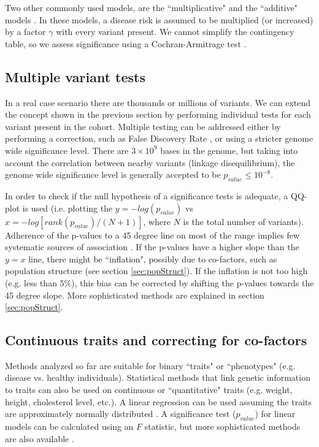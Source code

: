 Two other commonly used models, are the ``multiplicative" and the ``additive" models \cite{balding2006tutorial,clarke2011basic}. In these models, a disease risk is assumed to be multiplied (or increased) by a factor $\gamma$ with every variant present. We cannot simplify the contingency table, so we assess significance using a Cochran-Armitrage test \cite{clarke2011basic}.

\subsection{Multiple variant tests}

In a real case scenario there are thousands or millions of variants. We can extend the concept shown in the previous section by performing individual tests for each variant present in the cohort. Multiple testing can be addressed either by performing a correction, such as False Discovery Rate \cite{balding2006tutorial, clarke2011basic}, or using a stricter genome wide significance level. There are $3 \times 10^9$ bases in the genome, but taking into account the correlation between nearby variants (linkage disequilibrium), the genome wide significance level is generally accepted to be $p_{value} \leq 10^{-8}$.

In order to check if the null hypothesis of a significance tests is adequate, a QQ-plot is used (i.e. plotting the $y = -log(p_{value})$ vs $x = -log[ rank(p_{value}) / (N+1) ]$, where $N$ is the total number of variants). Adherence of the p-values to a 45 degree line on most of the range implies few systematic sources of association \cite{balding2006tutorial, clarke2011basic}. If the p-values have a higher slope than the $y=x$ line, there might be ``inflation", possibly due to co-factors, such as population structure (see section \ref{sec:popStruct}). If the inflation is not too high (e.g. less than $5\%$), this bias can be corrected by shifting the p-values towards the 45 degree slope. More sophisticated methods are explained in section \ref{sec:popStruct}.

\subsection{Continuous traits and correcting for co-factors \label{sec:cofactors}}

Methods analyzed so far are suitable for binary ``traits" or ``phenotypes" (e.g. disease vs. healthy individuals). Statistical methods that link genetic information to traits can also be used on continuous or ``quantitative" traits (e.g. weight, height, cholesterol level, etc.). A linear regression can be used assuming the traits are approximately normally distributed \cite{balding2006tutorial, clarke2011basic}. A significance test ($p_{value}$) for linear models can be calculated using an $F$ statistic, but more sophisticated methods are also available \cite{balding2006tutorial, clarke2011basic}.

